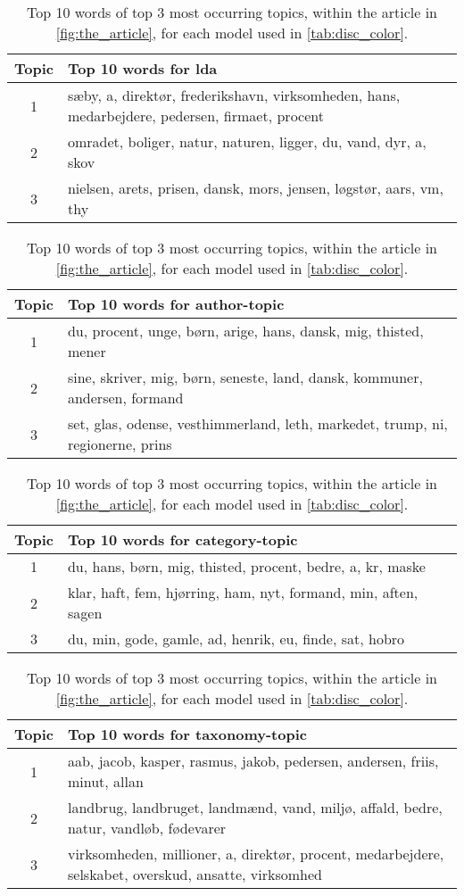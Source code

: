 \begin{table}
	\caption{Top 10 words of top 3 most occurring topics, within the article in \autoref{fig:the_article}, for each model used in \autoref{tab:disc_color}.}
	\label{tab:top_words_three_models}
	\begin{tabular}{c|p{}}
		Topic & Top 10 words for \gls{lda} \\
		\midrule
		1 & sæby, a, direktør, frederikshavn, virksomheden, hans, medarbejdere, pedersen, firmaet, procent \\
		2 & omradet, boliger, natur, naturen, ligger, du, vand, dyr, a, skov \\
		3 & nielsen, arets, prisen, dansk, mors, jensen, løgstør, aars, vm, thy \\
	\end{tabular}
	\begin{tabular}{c|p{}}
		\midrule
		Topic & Top 10 words for author-topic \\
		\midrule
		1 & du, procent, unge, børn, arige, hans, dansk, mig, thisted, mener\\
		2 & sine, skriver, mig, børn, seneste, land, dansk, kommuner, andersen, formand \\
		3 & set, glas, odense, vesthimmerland, leth, markedet, trump, ni, regionerne, prins\\
	\end{tabular}
	\begin{tabular}{c|p{}}
		\midrule
		Topic & Top 10 words for category-topic \\
		\midrule
		1 & du, hans, børn, mig, thisted, procent, bedre, a, kr, maske \\
		2 & klar, haft, fem, hjørring, ham, nyt, formand, min, aften, sagen\\
		3 & du, min, gode, gamle, ad, henrik, eu, finde, sat, hobro\\
	\end{tabular}
	\begin{tabular}{c|p{}}
		\midrule
		Topic & Top 10 words for taxonomy-topic \\
		\midrule
		1 & aab, jacob, kasper, rasmus, jakob, pedersen, andersen, friis, minut, allan \\
		2 & landbrug, landbruget, landmænd, vand, miljø, affald, bedre, natur, vandløb, fødevarer \\
		3 & virksomheden, millioner, a, direktør, procent, medarbejdere, selskabet, overskud, ansatte, virksomhed \\
	\end{tabular}
\end{table}

